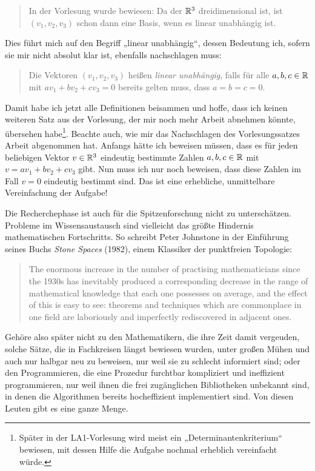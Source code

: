 \begin{de}
    \begin{quote}
        In der Vorlesung wurde bewiesen: Da der $\mathbb R^3$ dreidimensional ist, ist $(v_1,v_2,v_3)$ schon dann eine Basis, wenn es linear unabhängig ist.
    \end{quote}
    Dies führt mich auf den Begriff „linear unabhängig“, dessen Bedeutung ich, sofern sie mir nicht absolut klar ist, ebenfalls nachschlagen muss:
    \begin{quote}
        Die Vektoren $(v_1,v_2,v_3)$ heißen \emph{linear unabhängig}, falls für alle $a,b,c\in \mathbb R$ mit $av_1+bv_2+cv_3=0$ bereits gelten muss, dass $a=b=c=0$.
    \end{quote}
    Damit habe ich jetzt alle Definitionen beisammen und hoffe, dass ich keinen weiteren Satz aus der Vorlesung, der mir noch mehr Arbeit abnehmen könnte, übersehen habe\footnote{Später in der LA1-Vorlesung wird meist ein „Determinantenkriterium“ bewiesen, mit dessen Hilfe die Aufgabe nochmal erheblich vereinfacht würde.}. Beachte auch, wie mir das Nachschlagen des Vorlesungssatzes Arbeit abgenommen hat. Anfangs hätte ich beweisen müssen, dass es für jeden beliebigen Vektor $v\in \mathbb R^3$ eindeutig bestimmte Zahlen $a,b,c\in \mathbb R$ mit $v=av_1+bv_2+cv_3$ gibt. Nun muss ich nur noch beweisen, dass diese Zahlen im Fall $v=0$ eindeutig bestimmt sind. Das ist eine erhebliche, unmittelbare Vereinfachung der Aufgabe!
\end{de}


\begin{bem}
    Die Recherchephase ist auch für die Spitzenforschung nicht zu unterschätzen. Probleme im Wissensaustausch sind vielleicht das größte Hindernis mathematischen Fortschritts. So schreibt Peter Johnstone in der Einführung seines Buchs \emph{Stone Spaces} (1982), einem Klassiker der punktfreien Topologie:
    \begin{quote}
        The enormous increase in the number of practising mathematicians since the 1930s has inevitably produced a corresponding decrease in the range of mathematical knowledge that each one possesses on average, and the effect of this is easy to see: theorems and techniques which are commonplace in one field are laboriously and imperfectly rediscovered in adjacent ones.
    \end{quote}
    Gehöre also später nicht zu den Mathematikern, die ihre Zeit damit vergeuden, solche Sätze, die in Fachkreisen längst bewiesen wurden, unter großen Mühen und auch nur halbgar neu zu beweisen, nur weil sie zu schlecht informiert sind; oder den Programmieren, die eine Prozedur furchtbar kompliziert und ineffizient programmieren, nur weil ihnen die frei zugänglichen Bibliotheken unbekannt sind, in denen die Algorithmen bereits hocheffizient implementiert sind. Von diesen Leuten gibt es eine ganze Menge.
\end{bem}


